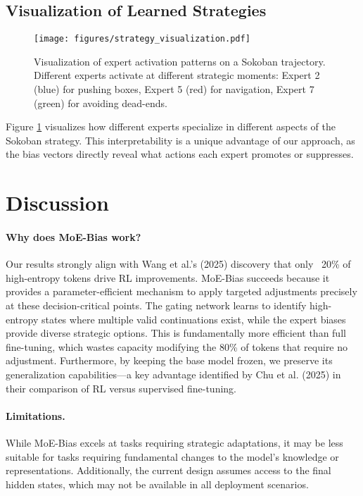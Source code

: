 \documentclass{article}
\begin{document}
\subsection{Visualization of Learned Strategies}

\begin{figure}[t]
\centering
\texttt{[image: figures/strategy\_visualization.pdf]}
\caption{Visualization of expert activation patterns on a Sokoban trajectory. Different experts activate at different strategic moments: Expert 2 (blue) for pushing boxes, Expert 5 (red) for navigation, Expert 7 (green) for avoiding dead-ends.}
\label{fig:strategy}
\end{figure}

Figure \ref{fig:strategy} visualizes how different experts specialize in different aspects of the Sokoban strategy. This interpretability is a unique advantage of our approach, as the bias vectors directly reveal what actions each expert promotes or suppresses.


\section{Discussion}

\paragraph{Why does MoE-Bias work?}
Our results strongly align with Wang et al.'s (2025) discovery that only ~20\% of high-entropy tokens drive RL improvements. MoE-Bias succeeds because it provides a parameter-efficient mechanism to apply targeted adjustments precisely at these decision-critical points. The gating network learns to identify high-entropy states where multiple valid continuations exist, while the expert biases provide diverse strategic options. This is fundamentally more efficient than full fine-tuning, which wastes capacity modifying the 80\% of tokens that require no adjustment. Furthermore, by keeping the base model frozen, we preserve its generalization capabilities—a key advantage identified by Chu et al. (2025) in their comparison of RL versus supervised fine-tuning.

\paragraph{Limitations.}
While MoE-Bias excels at tasks requiring strategic adaptations, it may be less suitable for tasks requiring fundamental changes to the model's knowledge or representations. Additionally, the current design assumes access to the final hidden states, which may not be available in all deployment scenarios.
\end{document}
